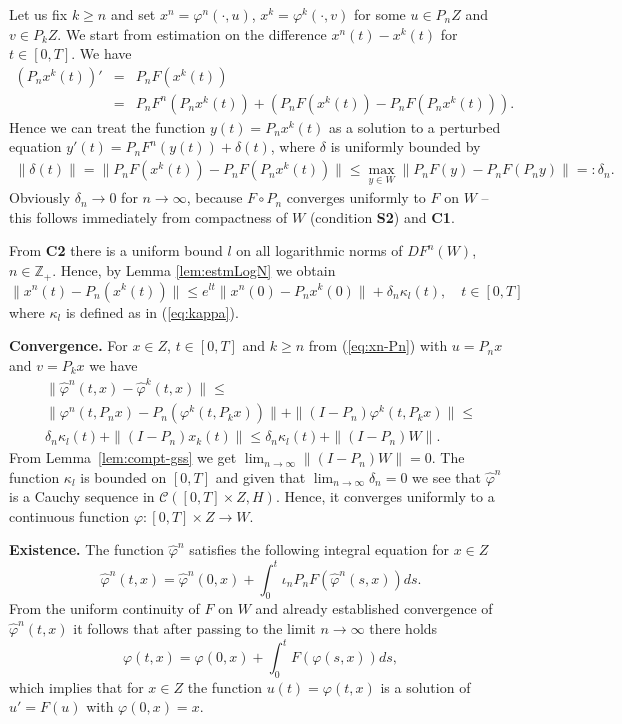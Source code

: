 Let us fix $k \geq n$ and set $x^n=\varphi^n(\cdot,u)$, $x^k=\varphi^k(\cdot,v)$ for some $u\in P_nZ$ and $v\in P_kZ$. We start from estimation on the difference $x^n(t)-x^k(t)$ for $t \in [0,T]$. We have
\begin{eqnarray*}
  (P_n x^k(t))'&=&P_n F(x^k(t)) \\
  &=&P_nF^n(P_nx^k(t)) + \left(P_n F(x^k(t)) - P_n F(P_nx^k(t)) \right).
\end{eqnarray*}
Hence we can treat the function $y(t)=P_n x^k(t)$ as a solution to a perturbed equation $y'(t)=P_nF^n(y(t))+\delta(t)$, where $\delta$ is uniformly bounded by
\begin{eqnarray*}
  \|\delta(t)\|=\|P_n F(x^k(t)) - P_n F(P_nx^k(t))\| \leq \max_{y \in W} \|P_n F(y) - P_nF(P_ny)\| =:\delta_n.
\end{eqnarray*}
Obviously $\delta_n \to 0$ for $n \to \infty $, because $F \circ P_n$ converges uniformly to $F$ on $W$ -- this follows immediately from compactness of $W$ (condition \textbf{S2}) and \textbf{C1}.

From \textbf{C2} there is a uniform bound $l$ on all logarithmic norms of $DF^n(W)$, $n\in\mathbb Z_+$. Hence, by Lemma \ref{lem:estmLogN} we obtain
\begin{equation}
  \|x^n(t) - P_n(x^k(t))\| \leq e^{lt}\|x^n(0) - P_nx^k(0)\| + \delta_n \kappa_l(t), \quad t \in [0,T]  \label{eq:xn-Pn}
\end{equation}
where $\kappa_l$ is defined as in (\ref{eq:kappa}).

\textbf{Convergence.} For $x\in Z$, $t\in[0,T]$ and $k\geq n$ from (\ref{eq:xn-Pn}) with $u=P_nx$ and $v=P_kx$ we have
\begin{multline*}
 \|\widehat\varphi^n(t,x) - \widehat\varphi^k(t,x)\| \leq  \\
 \|\varphi^n(t,P_nx) - P_n(\varphi^k(t,P_kx))\| + \|(I-P_n) \varphi^k(t,P_kx)\| \leq \\
    \delta_n \kappa_l(t) + \|(I-P_n) x_k(t)\| \leq
     \delta_n \kappa_l(t) + \|(I-P_n)W\|.
\end{multline*}
From Lemma~\ref{lem:compt-gss} we get $\lim_{n\to\infty}\|(I-P_n)W\| = 0$. The function $\kappa_l$ is bounded on $[0,T]$ and given that $\lim_{n\to\infty}\delta_n=0$ we see that $\widehat\varphi^n$ is a Cauchy sequence in $\mathcal{C}([0,T]\times Z,H)$. Hence, it converges uniformly to a continuous function $\varphi:[0,T]\times Z\to W$.

\textbf{Existence.}
The function $\widehat\varphi^n$ satisfies the following integral equation for $x\in Z$
\begin{equation*}
	\widehat \varphi^n(t,x)=\widehat \varphi^n(0,x) + \int_0^t \iota_n P_n F(\widehat\varphi^n(s,x))ds.
\end{equation*}
From the uniform continuity of $F$ on $W$ and already established convergence of $\widehat \varphi^n(t,x)$ it follows that after passing to the limit $n \to \infty$ there holds
\begin{equation*}
	\varphi(t,x)=\varphi(0,x) + \int_0^t F(\varphi(s,x))ds,
\end{equation*}
which implies that for $x\in Z$ the function $u(t) = \varphi(t,x)$ is a solution of $u'=F(u)$ with $\varphi(0,x)=x$.

